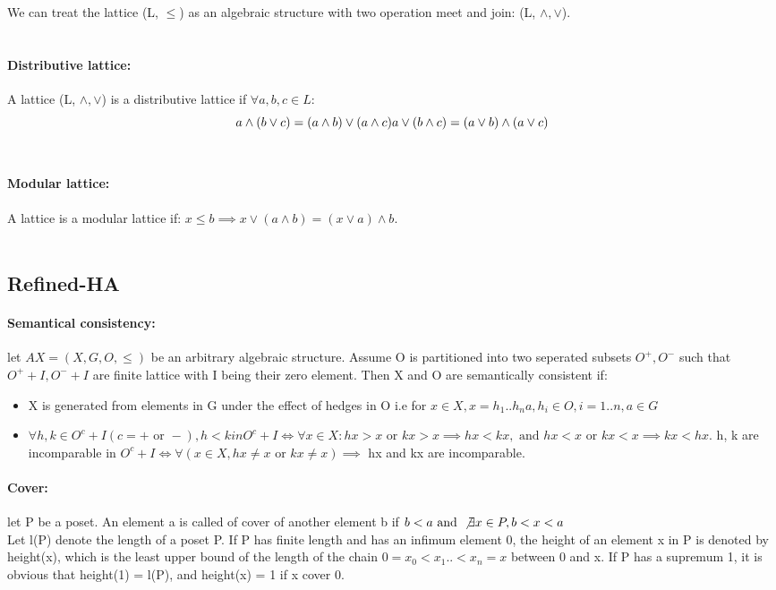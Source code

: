\documentclass[26pt,fleqn,]{article}
\begin{document}
We can treat the lattice (L, \(\le\)) as an algebraic structure with two operation meet and join: (L,
\(\wedge, \vee\)).\\\\

\paragraph{Distributive lattice: } A lattice (L, \(\wedge, \vee\)) is a distributive lattice if \(
\forall a,b,c \in L\): \\
\[ a \wedge (b \vee c) = (a \wedge b) \vee (a \wedge c)\\
a \vee (b \wedge c) = (a \vee b) \wedge (a \vee c)\\\]
\\
\paragraph{Modular lattice: } A lattice is a modular lattice if: \(x \le b \implies x \vee (a \wedge b)
= (x \vee a) \wedge b\).\\\\

\subsection{Refined-HA}
\paragraph{Semantical consistency: } let \( AX = (X,G,O,\le)\) be an arbitrary algebraic structure. 
Assume O is partitioned into two seperated subsets \( O^+, O^-\) such that \(O^+ + I, O^- + I\) are 
finite lattice with I being their zero element. Then X and O are semantically consistent if:
\begin{itemize}
	\item X is generated from elements in G under the effect of hedges in O i.e for \(x \in X, 
		x = h_1..h_na, h_i \in O, i = 1..n, a \in G\)
	\item \(\forall h,k \in O^c+I (c = + \text{ or } -), h<k in O^c+I \iff \forall x \in X:
		hx > x \text{ or } kx > x \implies hx < kx, \text{ and } hx < x \text{ or } kx <x
		\implies kx < hx\). h, k are incomparable in \(O^c+I \iff \forall (x \in X, hx \neq x
		\text{ or } kx \neq x) \implies\) hx and kx are incomparable.\\
\end{itemize}
%
\paragraph{Cover: } let P be a poset. An element a is called of cover of another element b if
\(b < a \text{ and } \not \exists x \in P, b < x < a\)\\
Let l(P) denote the length of a poset P. If P has finite length and has an infimum element 0, 
the height of an element x in P is denoted by height(x), which is the least upper bound of the length of
the chain \(0 = x_0<x_1..<x_n = x\) between 0 and x. If P has a supremum 1, it is obvious that height(1)
= l(P), and height(x) = 1 if x cover 0.\\\\
\end{document}
